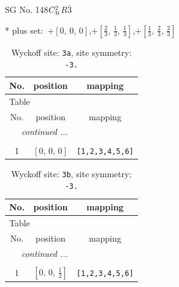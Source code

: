 \documentclass[fleqn,8pt]{jsarticle}
\begin{document}
\setcounter{MaxMatrixCols}{32}

\renewcommand{\tablename}{Table~}
\renewcommand{\figurename}{Figure~}
\begin{center}
\LARGE
SG No. 148\quad$C_{\rm 3i}^{2}$\quad$R\bar{3}$\quad[ trigonal ]
\end{center}
* plus set:\,\,\,$+\left[ 0,\, 0,\, 0 \right]$,\quad $+\left[ \frac{2}{3},\, \frac{1}{3},\, \frac{1}{3} \right]$,\quad $+\left[ \frac{1}{3},\, \frac{2}{3},\, \frac{2}{3} \right]$
\renewcommand{\arraystretch}{1.2}
\begin{longtable}{ccc}
\caption{Wyckoff site: {\tt 3a}, site symmetry: {\tt -3.}}
 \\
 \hline \hline
No. & position & mapping \\ \hline \endfirsthead

\multicolumn{2}{l}{\tablename\ \thetable{}} \\
 \hline \hline
No. & position & mapping \\ \hline \endhead

 \hline \hline
\multicolumn{2}{r}{\footnotesize\it continued ...} \\ \endfoot

 \hline \hline
\multicolumn{2}{r}{} \\ \endlastfoot

1 & $\left[ 0,\, 0,\, 0 \right]$ & {\tt [1,2,3,4,5,6]} \\
\end{longtable}
\renewcommand{\arraystretch}{1.2}
\begin{longtable}{ccc}
\caption{Wyckoff site: {\tt 3b}, site symmetry: {\tt -3.}}
 \\
 \hline \hline
No. & position & mapping \\ \hline \endfirsthead

\multicolumn{2}{l}{\tablename\ \thetable{}} \\
 \hline \hline
No. & position & mapping \\ \hline \endhead

 \hline \hline
\multicolumn{2}{r}{\footnotesize\it continued ...} \\ \endfoot

 \hline \hline
\multicolumn{2}{r}{} \\ \endlastfoot

1 & $\left[ 0,\, 0,\, \frac{1}{2} \right]$ & {\tt [1,2,3,4,5,6]} \\
\end{longtable}
\renewcommand{\arraystretch}{1.2}
\end{document}

